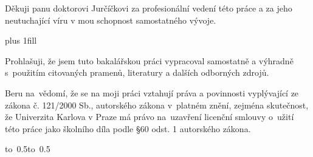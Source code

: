 \documentclass[12pt,a4paper]{report}
\let\openright=\clearpage
\begin{document}
\newpage



\openright

\noindent
Děkuji panu doktorovi Jurčíčkovi za profesionální vedení této práce a za jeho neutuchající víru v mou schopnost samostatného vývoje.

\newpage


\vglue 0pt plus 1fill

\noindent
Prohlašuji, že jsem tuto bakalářskou práci vypracoval samostatně a výhradně
s~použitím citovaných pramenů, literatury a dalších odborných zdrojů.

\medskip\noindent
Beru na~vědomí, že se na moji práci vztahují práva a povinnosti vyplývající
ze zákona č. 121/2000 Sb., autorského zákona v~platném znění, zejména skutečnost,
že Univerzita Karlova v Praze má právo na~uzavření licenční smlouvy o~užití této
práce jako školního díla podle §60 odst. 1 autorského zákona.

\vspace{10mm}

\hbox{\hbox to 0.5\hbox to 0.5}

\vspace{20mm}
\newpage

\end{document}

